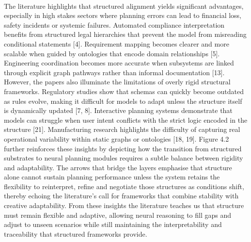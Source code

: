         \paragraph{}
        The literature highlights that structured alignment yields significant advantages, especially in high stakes sectors where planning errors can lead to financial loss, safety incidents or systemic failures. Automated compliance interpretation benefits from structured legal hierarchies that prevent the model from misreading conditional statements [4]. Requirement mapping becomes clearer and more scalable when guided by ontologies that encode domain relationships [5]. Engineering coordination becomes more accurate when subsystems are linked through explicit graph pathways rather than informal documentation [13]. However, the papers also illuminate the limitations of overly rigid structural frameworks. Regulatory studies show that schemas can quickly become outdated as rules evolve, making it difficult for models to adapt unless the structure itself is dynamically updated [7, 8]. Interactive planning systems demonstrate that models can struggle when user intent conflicts with the strict logic encoded in the structure [21]. Manufacturing research highlights the difficulty of capturing real operational variability within static graphs or ontologies [18, 19]. Figure 4.2 further reinforces these insights by depicting how the transition from structured substrates to neural planning modules requires a subtle balance between rigidity and adaptability. The arrows that bridge the layers emphasise that structure alone cannot sustain planning performance unless the system retains the flexibility to reinterpret, refine and negotiate those structures as conditions shift, thereby echoing the literature’s call for frameworks that combine stability with creative adaptability. From these insights the literature teaches us that structure must remain flexible and adaptive, allowing neural reasoning to fill gaps and adjust to unseen scenarios while still maintaining the interpretability and traceability that structured frameworks provide.
        
